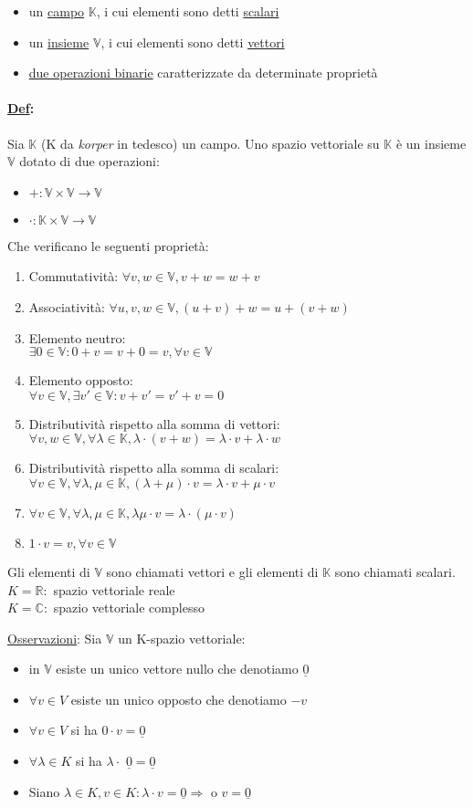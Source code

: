 \documentclass{article}
\newcommand{\ul}[1]{\underline{#1}}
\newcommand{\K}{\mathbb{K}}
\newcommand{\R}{\mathbb{R}}
\newcommand{\V}{\mathbb{V}}
\newcommand{\Def}[2]{\paragraph{\ul{Def}:}#1\\\hspace*{3em}\begin{minipage}{.8\textwidth}#2\end{minipage}}
\begin{document}
\begin{itemize}
	\item un \ul{campo} $\K$, i cui elementi sono detti \ul{scalari}
	\item un \ul{insieme} $\V$, i cui elementi sono detti \ul{vettori}
	\item \ul{due operazioni binarie} caratterizzate da determinate proprietà
\end{itemize}
\Def{Sia $\K$ (K da \textit{korper} in tedesco) un campo. Uno spazio vettoriale su $\K$ è un insieme $\V$ dotato di due operazioni:}{
	\begin{itemize}
		\item $+:\V\times\V\rightarrow\V$
		\item $\cdot:\K\times\V\rightarrow\V$
	\end{itemize}
	Che verificano le seguenti proprietà:
	\begin{enumerate}
		\item Commutatività: $\forall v,w\in\V, v+w=w+v$
		\item Associatività: $\forall u,v,w\in\V,(u+v)+w=u+(v+w)$
		\item Elemento neutro:\\$\exists0\in\V:0+v=v+0=v,\forall v\in\V$
		\item Elemento opposto:\\$\forall v\in\V,\exists v'\in\V:v+v'=v'+v=0$
		\item Distributività rispetto alla somma di vettori:\\$\forall v,w\in\V,\forall\lambda\in\K,\lambda\cdot(v+w)=\lambda\cdot v+\lambda\cdot w$
		\item Distributività rispetto alla somma di scalari:\\$\forall v\in\V,\forall\lambda,\mu\in\K,(\lambda+\mu)\cdot v=\lambda\cdot v+\mu\cdot v$
		\item $\forall v\in\V,\forall\lambda,\mu\in\K,\lambda\mu\cdot v=\lambda\cdot(\mu\cdot v)$
		\item $1\cdot v=v,\forall v\in\V$
	\end{enumerate}
	Gli elementi di $\V$ sono chiamati vettori e gli elementi di $\K$ sono chiamati scalari.\\
	$K=\R:$ spazio vettoriale reale\\
	$K=\mathbb{C}:$ spazio vettoriale complesso

	\ul{Osservazioni}: Sia $\V$ un K-spazio vettoriale:
	\begin{itemize}
		\item in $\V$ esiste un unico vettore nullo che denotiamo $\ul{0}$
		\item $\forall v\in V$ esiste un unico opposto che denotiamo $-v$
		\item $\forall v\in V$ si ha $0\cdot v=\ul{0}$
		\item $\forall\lambda\in K$ si ha $\lambda\cdot$ $\ul{0}=\ul{0}$
		\item Siano $\lambda\in K,v\in K:\lambda\cdot v=\ul{0}\Rightarrow$ o $v=\ul{0}$
	\end{itemize}
}
\end{document}
